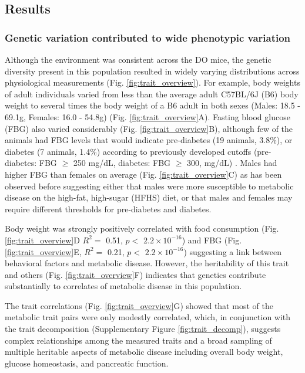 \documentclass[
]{article}
\begin{document}
\subsection{Results}\label{results}

\subsubsection{Genetic variation contributed to wide phenotypic
variation}\label{genetic-variation-contributed-to-wide-phenotypic-variation}

Although the environment was consistent across the DO mice, the genetic
diversity present in this population resulted in widely varying
distributions across physiological measurements (Fig.
\ref{fig:trait_overview}). For example, body weights of adult
individuals varied from less than the average adult C57BL/6J (B6) body
weight to several times the body weight of a B6 adult in both sexes
(Males: 18.5 - 69.1g, Females: 16.0 - 54.8g) (Fig.
\ref{fig:trait_overview}A). Fasting blood glucose (FBG) also varied
considerably (Fig. \ref{fig:trait_overview}B), although few of the
animals had FBG levels that would indicate pre-diabetes (19 animals,
3.8\%), or diabetes (7 animals, 1.4\%) according to previously developed
cutoffs (pre-diabetes: FBG \(\geq\) 250 mg/dL, diabetes: FBG \(\geq\)
300, mg/dL) \cite{pmid17018838}. Males had higher FBG than females on
average (Fig. \ref{fig:trait_overview}C) as has been observed before
suggesting either that males were more susceptible to metabolic disease
on the high-fat, high-sugar (HFHS) diet, or that males and females may
require different thresholds for pre-diabetes and diabetes.

Body weight was strongly positively correlated with food consumption
(Fig. \ref{fig:trait_overview}D \(R^2 =\) 0.51, \(p<\)
\ensuremath{2.2\times 10^{-16}}) and FBG (Fig.
\ref{fig:trait_overview}E, \(R^2=\) 0.21, \(p <\)
\ensuremath{2.2\times 10^{-16}}) suggesting a link between behavioral
factors and metabolic disease. However, the heritability of this trait
and others (Fig. \ref{fig:trait_overview}F) indicates that genetics
contribute substantially to correlates of metabolic disease in this
population.

The trait correlations (Fig. \ref{fig:trait_overview}G) showed that most
of the metabolic trait pairs were only modestly correlated, which, in
conjunction with the trait decomposition (Supplementary Figure
\ref{fig:trait_decomp}), suggests complex relationships among the
measured traits and a broad sampling of multiple heritable aspects of
metabolic disease including overall body weight, glucose homeostasis,
and pancreatic function.
\end{document}
